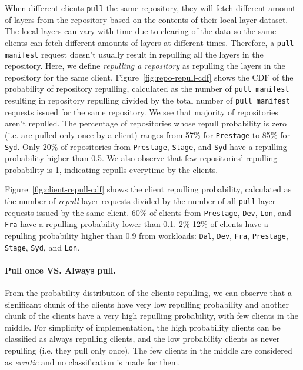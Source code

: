When different clients \texttt{pull} the same repository, 
they will fetch different amount of layers from the repository based on the contents of their local layer dataset. The local layers can vary with time due to clearing of the data so the same clients can fetch different amounts of layers at different times.
Therefore, a \texttt{pull manifest} request doesn't usually result in repulling all the layers in the repository. 
Here, we define \emph{repulling a repository} as repulling the layers in the repository for the same client.
Figure~\ref{fig:repo-repull-cdf} shows the CDF of the probability of repository repulling, calculated 
as the number of \texttt{pull manifest} resulting in repository repulling divided by 
the total number of \texttt{pull manifest} requests issued for the same repository.
We see that majority of repositories aren't repulled.
The percentage of repositories whose repull probability is zero (i.e. are pulled only once by a client) ranges from 57\% for \texttt{Prestage} to 85\% for \texttt{Syd}.
Only 20\% of repositories from  \texttt{Prestage}, \texttt{Stage}, and 
\texttt{Syd} have a repulling probability higher than 0.5.
We also observe that few repositories' repulling probability is 1, indicating repulls everytime by the clients.

Figure~\ref{fig:client-repull-cdf} shows the client repulling probability, calculated as the number of \emph{repull} layer requests divided by
the number of all \texttt{pull} layer requests issued by the same client.
60\% of clients from \texttt{Prestage}, \texttt{Dev}, \texttt{Lon}, and \texttt{Fra} have a repulling probability lower than 0.1.
2\%-12\% of clients have a repulling probability higher than 0.9 from workloads:
\texttt{Dal}, \texttt{Dev}, \texttt{Fra}, \texttt{Prestage},
\texttt{Stage}, \texttt{Syd}, and \texttt{Lon}.

\paragraph{Pull once VS. Always pull.}
From the probability distribution of the clients repulling, we can observe that a significant chunk of the clients have very low repulling probability and another chunk of the clients have a very high repulling probability, with few clients in the middle. For simplicity of implementation, the high probability clients can be classified as always repulling clients, and the low probability clients as never repulling (i.e. they pull only once). The few clients in the middle are considered as \emph{erratic} and no classification is made for them.



